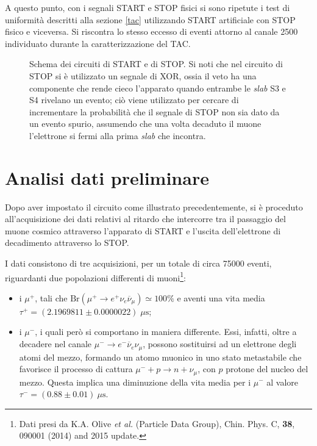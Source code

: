 \documentclass[10pt, oneside, a4paper]{article}   	%
\begin{document}
A questo punto, con i segnali START e STOP fisici si sono ripetute i test di uniformità descritti alla sezione \ref{tac} utilizzando START artificiale con STOP fisico e viceversa. Si riscontra lo stesso eccesso di eventi attorno al canale 2500 individuato durante la caratterizzazione del TAC.
%
\begin{figure}[h]
	\centering
	
	\caption{Schema dei circuiti di START e di STOP. Si noti che nel circuito di STOP si è utilizzato un segnale di XOR, ossia il veto ha una componente che rende cieco l'apparato quando entrambe le \emph{slab} S3 e S4 rivelano un evento; ciò viene utilizzato per cercare di incrementare la probabilità che il segnale di STOP non sia dato da un evento spurio, assumendo che una volta decaduto il muone l'elettrone si fermi alla prima \emph{slab} che incontra.}
	\label{scemi}
\end{figure}
%
\section{Analisi dati preliminare}
Dopo aver impostato il circuito come illustrato precedentemente, si è proceduto all'acquisizione dei dati relativi al ritardo che intercorre tra il passaggio del muone cosmico attraverso l'apparato di START e l'uscita dell'elettrone di decadimento attraverso lo STOP.

I dati consistono di tre acquisizioni, per un totale di circa 75000 eventi, riguardanti due popolazioni differenti di muoni\footnote{Dati presi da K.A. Olive \emph{et al.} (Particle Data Group), Chin. Phys. C, \textbf{38}, 090001 (2014) and 2015 update.}:
\begin{itemize}
	\item i $\mu^+$, tali che $\mbox{Br}(\mu^+ \to e^+\nu_e\overline{\nu}_\mu)\simeq 100 \%$ e aventi una vita media \linebreak $\tau^+=(2.1969811 \pm 0.0000022)\;\mu\mbox{s}$;
\item i $\mu^-$, i quali però si comportano in maniera differente. Essi, infatti, oltre a decadere nel canale $\mu^-\to e^-\overline{\nu}_e\nu_\mu$, possono sostituirsi ad un elettrone degli atomi del mezzo, formando un atomo muonico in uno stato metastabile che favorisce il processo di cattura $\mu^-+p\to n+\nu_\mu $, con $p$ protone del nucleo del mezzo. Questa implica una diminuzione della vita media per i $\mu^-$ al valore $\tau^-=(0.88 \pm 0.01) \ \mu \mbox{s}$.
\end{itemize}
\end{document}
